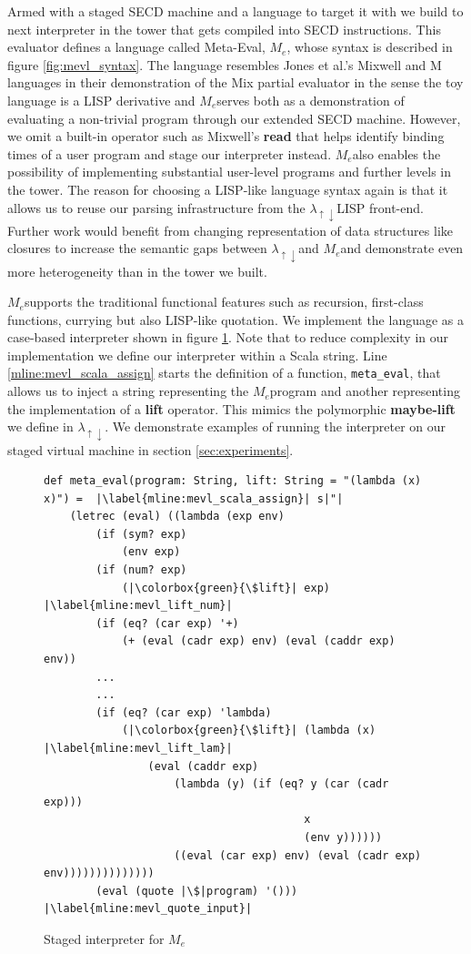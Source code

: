 \documentclass[a4paper,12pt,twoside,openright]{report}
\theoremstyle{definition}
\newcommand{\mslang}{$\lambda_{\uparrow\downarrow}$}
\newcommand{\mevl}{$M_{e}$}
\begin{document}
Armed with a staged SECD machine and a language to target it with we build to next interpreter in the tower that gets compiled into SECD instructions. This evaluator defines a language called Meta-Eval, \mevl, whose syntax is described in figure \ref{fig:mevl_syntax}. The language resembles Jones et al.'s Mixwell and M languages in their demonstration of the Mix partial evaluator \cite{jones1989mix} in the sense the toy language is a LISP derivative and \mevl serves both as a demonstration of evaluating a non-trivial program through our extended SECD machine. However, we omit a built-in operator such as Mixwell's \textbf{read} that helps identify binding times of a user program and stage our interpreter instead. \mevl also enables the possibility of implementing substantial user-level programs and further levels in the tower. The reason for choosing a LISP-like language syntax again is that it allows us to reuse our parsing infrastructure from the \mslang LISP front-end. Further work would benefit from changing representation of data structures like closures to increase the semantic gaps between \mslang and \mevl and demonstrate even more heterogeneity than in the tower we built.

\mevl supports the traditional functional features such as recursion, first-class functions, currying but also LISP-like quotation. We implement the language as a case-based interpreter shown in figure \ref{lst:mevl}. Note that to reduce complexity in our implementation we define our interpreter within a Scala string. Line \ref{mline:mevl_scala_assign} starts the definition of a function, \texttt{meta\_eval}, that allows us to inject a string representing the \mevl program and another representing the implementation of a \textbf{lift} operator. This mimics the polymorphic \textbf{maybe-lift} we define in \mslang. We demonstrate examples of running the interpreter on our staged virtual machine in section \ref{sec:experiments}.

\begin{figure}[htp!]
\centering
\begin{verbatim}
def meta_eval(program: String, lift: String = "(lambda (x) x)") =  |\label{mline:mevl_scala_assign}| s|"|
    (letrec (eval) ((lambda (exp env)
        (if (sym? exp)
            (env exp)
        (if (num? exp)
            (|\colorbox{green}{\$lift}| exp) |\label{mline:mevl_lift_num}|
        (if (eq? (car exp) '+)
            (+ (eval (cadr exp) env) (eval (caddr exp) env))
        ...
        ...
        (if (eq? (car exp) 'lambda)
            (|\colorbox{green}{\$lift}| (lambda (x) |\label{mline:mevl_lift_lam}|
                (eval (caddr exp)
                    (lambda (y) (if (eq? y (car (cadr exp)))
                                        x
                                        (env y))))))
                    ((eval (car exp) env) (eval (cadr exp) env))))))))))))))
        (eval (quote |\$|program) '())) |\label{mline:mevl_quote_input}|
\end{verbatim}
\caption{Staged interpreter for \mevl}
\label{lst:mevl}
\end{figure}
\end{document}

